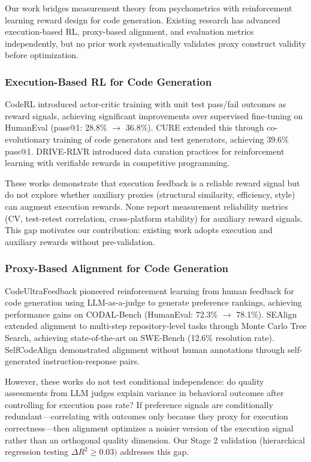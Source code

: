 
Our work bridges measurement theory from psychometrics with reinforcement learning reward design for code generation. Existing research has advanced execution-based RL, proxy-based alignment, and evaluation metrics independently, but no prior work systematically validates proxy construct validity before optimization.

\subsubsection{Execution-Based RL for Code Generation}

CodeRL \citep{Le2022CodeRL} introduced actor-critic training with unit test pass/fail outcomes as reward signals, achieving significant improvements over supervised fine-tuning on HumanEval (pass@1: 28.8\% $\rightarrow$ 36.8\%). CURE \citep{Tian2023} extended this through co-evolutionary training of code generators and test generators, achieving 39.6\% pass@1. DRIVE-RLVR \citep{Liu2024} introduced data curation practices for reinforcement learning with verifiable rewards in competitive programming.

These works demonstrate that execution feedback is a reliable reward signal but do not explore whether auxiliary proxies (structural similarity, efficiency, style) can augment execution rewards. None report measurement reliability metrics (CV, test-retest correlation, cross-platform stability) for auxiliary reward signals. This gap motivates our contribution: existing work adopts execution and auxiliary rewards without pre-validation.

\subsubsection{Proxy-Based Alignment for Code Generation}

CodeUltraFeedback pioneered reinforcement learning from human feedback for code generation using LLM-as-a-judge to generate preference rankings, achieving performance gains on CODAL-Bench (HumanEval: 72.3\% $\rightarrow$ 78.1\%). SEAlign extended alignment to multi-step repository-level tasks through Monte Carlo Tree Search, achieving state-of-the-art on SWE-Bench (12.6\% resolution rate). SelfCodeAlign demonstrated alignment without human annotations through self-generated instruction-response pairs.

However, these works do not test conditional independence: do quality assessments from LLM judges explain variance in behavioral outcomes after controlling for execution pass rate? If preference signals are conditionally redundant---correlating with outcomes only because they proxy for execution correctness---then alignment optimizes a noisier version of the execution signal rather than an orthogonal quality dimension. Our Stage 2 validation (hierarchical regression testing $\Delta R^2 \geq 0.03)$ addresses this gap.

